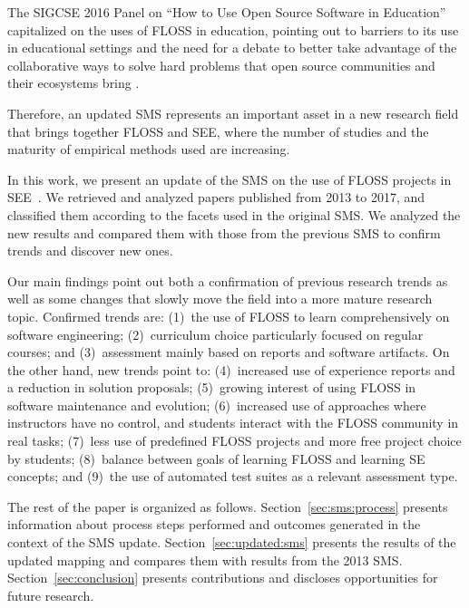 The SIGCSE 2016 Panel on ``How to Use Open Source Software in Education'' capitalized on the uses of FLOSS in education, 
pointing out to barriers to its use in educational settings and 
the need for a debate to better take advantage of the collaborative ways to solve hard problems that open source communities and their ecosystems bring \cite{Bishop:2016}.

Therefore, an updated SMS represents an important 
asset in a new research field that brings together 
FLOSS and SEE, where the number of studies and the maturity of empirical methods used are increasing.

In this work, we present an update of the SMS on 
the use of FLOSS projects in 
SEE~\cite{2015:CSE:nascimento}.
We retrieved and analyzed papers published from 2013 to 2017,
and classified them according to the facets used in the original SMS.
We analyzed the new results and compared them
with those from the previous SMS 
to confirm trends and discover new ones.

Our main findings point out both a confirmation of previous research trends as well as some changes that slowly move the field into a more mature research topic. Confirmed trends are: 
(1)~the use of FLOSS to learn comprehensively on software engineering; (2)~curriculum choice particularly focused on regular courses; and 
(3)~assessment mainly based on reports and software artifacts. 
On the other hand, new trends point to: 
(4)~increased use of experience reports and a reduction in solution proposals; 
(5)~growing interest of using FLOSS in software maintenance and evolution; 
(6)~increased use of approaches where instructors have no control, and students interact with the FLOSS community in real tasks; 
(7)~less use of predefined FLOSS projects and more free project choice by students; 
(8)~balance between goals of learning FLOSS and learning SE concepts; and (9)~the use of automated test suites as a relevant assessment type.    

The rest of the paper is organized as follows.
Section~\ref{sec:sms:process} presents information about process steps 
performed and outcomes generated in the context of the SMS update.
Section~\ref{sec:updated:sms} presents the results of the updated mapping and compares them with results from the 2013 SMS.
Section~\ref{sec:conclusion} presents contributions and discloses opportunities for future research.


